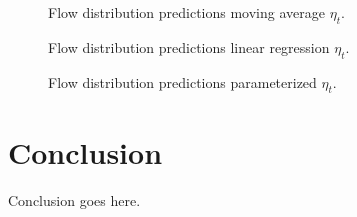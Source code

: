 \documentclass{sig-alternate-ipsn13}
\begin{document}
\begin{figure}
  \centering
  \caption{Flow distribution predictions moving average $\eta_t$.}
  \label{fig:moving_eta_predictions}
\end{figure}


\begin{figure}
  \centering
  \caption{Flow distribution predictions linear regression $\eta_t$.}
  \label{fig:linear_regression_eta_predictions}
\end{figure}

\begin{figure}
  \centering
  \caption{Flow distribution predictions parameterized $\eta_t$.}
  \label{fig:parameterized_eta_predictions}
\end{figure}








\section{Conclusion}
\label{sec:conclusion}
Conclusion goes here.
\end{document}
